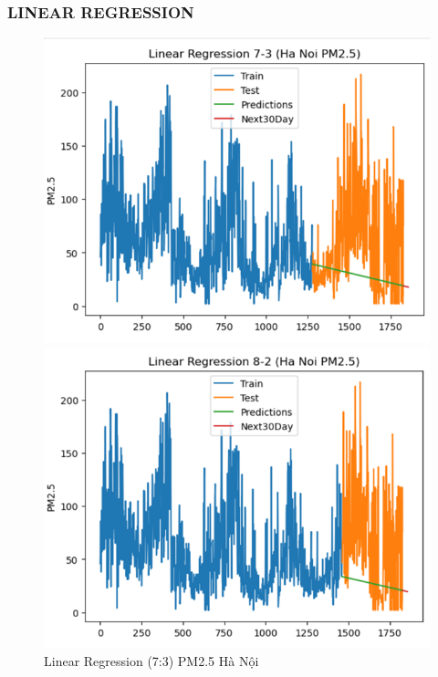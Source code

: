 \subsubsection{LINEAR REGRESSION}
\begin{figure}[h]
    \centering
    \begin{minipage}[b]{0.45\linewidth}
        \centering
        \includegraphics[width=\linewidth]{img/LN_7_3_HN.png}
        \caption{\scriptsize Linear Regression (7:3) PM2.5 Hà Nội}
        \label{fig1}
    \end{minipage}\hfill
    \begin{minipage}[b]{0.45\linewidth}
        \centering
        \includegraphics[width=\linewidth]{img/LN_8_2_HN.png}

\end{minipage}
\end{figure}
